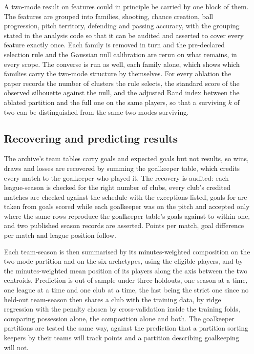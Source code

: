 A two-mode result on \ArcFeatures{} features could in principle be carried by one block of them.
The features are grouped into \AblFamiliesWord{} families, shooting, chance creation, ball progression, pitch
territory, defending and passing accuracy, with the grouping stated in the analysis code so that
it can be audited and asserted to cover every feature exactly once. Each family is removed in
turn and the pre-declared selection rule and the Gaussian null calibration are rerun on what
remains, in every scope. The converse is run as well, each family alone, which shows which
families carry the two-mode structure by themselves. For every ablation the paper records the
number of clusters the rule selects, the standard score of the observed silhouette against the
null, and the adjusted Rand index between the ablated partition and the full one on the same
players, so that a surviving $k$ of two can be distinguished from the same two modes surviving.

\subsection{Recovering and predicting results}

The archive's team tables carry goals and expected goals but not results, so wins, draws and
losses are recovered by summing the goalkeeper table, which credits every match to the
goalkeeper who played it. The recovery is audited: each league-season is checked for the right
number of clubs, every club's credited matches are checked against the schedule with the
exceptions listed, goals for are taken from goals scored while each goalkeeper was on the pitch
and accepted only where the same rows reproduce the goalkeeper table's goals against to within
one, and two published season records are asserted. Points per match, goal difference per match
and league position follow.

Each team-season is then summarised by its minutes-weighted composition on the two-mode partition
and on the six archetypes, using the eligible players, and by the minutes-weighted mean position
of its players along the axis between the two centroids. Prediction is out of sample under three
holdouts, one season at a time, one league at a time and one club at a time, the last being the
strict one since no held-out team-season then shares a club with the training data, by ridge
regression with the penalty chosen by cross-validation inside the training folds, comparing
possession alone, the composition alone and both. The goalkeeper partitions are tested the same
way, against the prediction that a partition sorting keepers by their teams will track points
and a partition describing goalkeeping will not.

